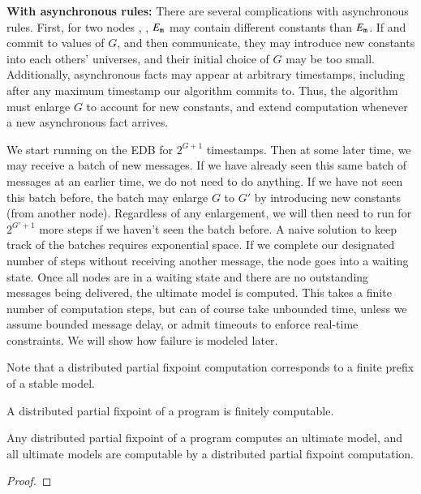 \vspace{1em}
{\bf With asynchronous rules:}
There are several complications with asynchronous rules.  First, for two nodes , , $E_{\text{\dedalus{{\scriptsize m}}}}$ may contain different constants than $E_{\text{\dedalus{{\scriptsize m}}}}$.  If  and  commit to values of $G$, and then communicate, they may introduce new constants into each others' universes, and their initial choice of $G$ may be too small.  Additionally, asynchronous facts may appear at arbitrary timestamps, including after any maximum timestamp our algorithm commits to.  Thus, the algorithm must enlarge $G$ to account for new constants, and extend computation whenever a new asynchronous fact arrives.

We start running on the EDB for $2^{G+1}$ timestamps.  Then at some later time, we may receive a batch of new messages.  If we have already seen this same batch of messages at an earlier time, we do not need to do anything.  If we have not seen this batch before, the batch may enlarge $G$ to $G'$ by introducing new constants (from another node).  Regardless of any enlargement, we will then need to run for $2^{G'+1}$ more steps if we haven't seen the batch before.  A naive solution to keep track of the batches requires exponential space.  If we complete our designated number of steps without receiving another message, the node goes into a waiting state.  Once all nodes are in a waiting state and there are no outstanding messages being delivered, the ultimate model is computed.  This takes a finite number of computation steps, but can of course take unbounded time, unless we assume bounded message delay, or admit timeouts to enforce real-time constraints.  We will show how failure is modeled later.

Note that a distributed partial fixpoint computation corresponds to a finite prefix of a stable model.  

\begin{lemma}
A distributed partial fixpoint of a \lang program is finitely computable.
\end{lemma}

\begin{lemma}   
Any distributed partial fixpoint of a \lang program computes an ultimate model, and all ultimate models are computable by a distributed partial fixpoint computation.
\end{lemma}
\begin{proof}

\end{proof}

